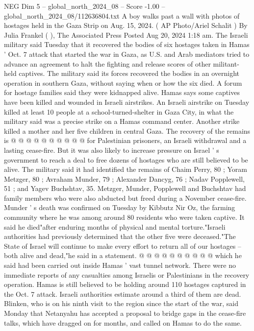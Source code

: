 \begin{textsample}{NEG Dim 5 – global\_north\_2024\_08 – Score -1.00 – global\_north\_2024\_08/112636804.txt}  \label{ex:f5_neg_071}
A boy walks past a wall with photos of hostages held in the Gaza Strip on Aug. 15, 2024. ( AP Photo/Ariel Schalit ) By Julia Frankel ( ), The Associated Press Posted Aug 20, 2024 1:18 am.
The Israeli military said Tuesday that it recovered the bodies of six hostages taken in Hamas ' Oct. 7 attack that started the war in Gaza, as U.S. and Arab mediators tried to advance an agreement to halt the fighting and release scores of other militant-held captives.
The military said its forces recovered the bodies in an overnight operation in southern Gaza, without saying when or how the six died.
A forum for hostage families said they were kidnapped alive.
Hamas says some captives have been killed and wounded in Israeli airstrikes.
An Israeli airstrike on Tuesday killed at least 10 people at a school-turned-shelter in Gaza City, in what the military said was a precise strike on a Hamas command center.
Another strike killed a mother and her five children in central Gaza.
The recovery of the remains is @ @ @ @ @ @ @ @ @ @ for Palestinian prisoners, an Israeli withdrawal and a lasting cease-fire.
But it was also likely to increase pressure on Israel ' s government to reach a deal to free dozens of hostages who are still believed to be alive.
The military said it had identified the remains of Chaim Perry, 80 ; Yoram Metzger, 80 ; Avraham Munder, 79 ; Alexander Dancyg, 76 ; Nadav Popplewell, 51 ; and Yagev Buchshtav, 35.
Metzger, Munder, Popplewell and Buchshtav had family members who were also abducted but freed during a November cease-fire.
Munder ' s death was confirmed on Tuesday by Kibbutz Nir Oz, the farming community where he was among around 80 residents who were taken captive.
It said he died"after enduring months of physical and mental torture."Israeli authorities had previously determined that the other five were deceased."The State of Israel will continue to make every effort to return all of our hostages -- both alive and dead,"he said in a statement. @ @ @ @ @ @ @ @ @ @ which he said had been carried out inside Hamas ' vast tunnel network.
There were no immediate reports of any casualties among Israelis or Palestinians in the recovery operation.
Hamas is still believed to be holding around 110 hostages captured in the Oct. 7 attack.
Israeli authorities estimate around a third of them are dead.
Blinken, who is on his ninth visit to the region since the start of the war, said Monday that Netanyahu has accepted a proposal to bridge gaps in the cease-fire talks, which have dragged on for months, and called on Hamas to do the same.

\end{textsample}
